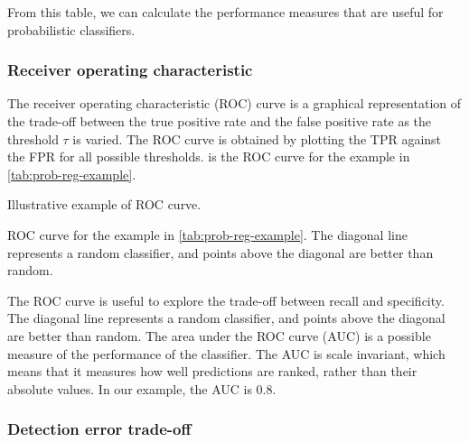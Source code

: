 From this table, we can calculate the performance measures that are useful for
probabilistic classifiers.

\subsubsection{Receiver operating characteristic}

The receiver operating characteristic (ROC) curve is a graphical representation of the
trade-off between the true positive rate and the false positive rate as the threshold
$\tau$ is varied.  The ROC curve is obtained by plotting the TPR against the FPR for all
possible thresholds.   is the ROC curve for the example in
\cref{tab:prob-reg-example}.

\begin{figurebox}[label=fig:roc-example]{Illustrative example of ROC curve.}
  \centering
  \tcblower
  ROC curve for the example in \cref{tab:prob-reg-example}.  The diagonal line represents
  a random classifier, and points above the diagonal are better than random.
\end{figurebox}

The ROC curve is useful to explore the trade-off between recall and specificity.  The
diagonal line represents a random classifier, and points above the diagonal are better
than random.  The area under the ROC curve (AUC) is a possible measure of the performance
of the classifier.  The AUC is scale invariant, which means that it measures how well
predictions are ranked, rather than their absolute values.  In our example, the AUC is
$0.8$.

\subsubsection{Detection error trade-off}

